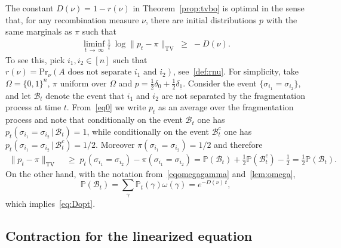 \documentclass[AHL,Unicode,longabstracts,published]{cedram}
\renewcommand{\geq}{\;\geqslant\;}
\newcommand{\si}{\sigma}
\newcommand{\tc}{\, |\, }
\newcommand{\tv}{\mathrm{TV}}
\newcommand{\cB}{\mathcal{B}}
\newcommand{\bbP}{\mathbb{P}}
\let\d=\delta
\let\g=\gamma
\let\o=\omega
\let\O=\Omega
\begin{document}
\begin{rema}\label{rem:Dopt}
The constant $D(\nu)=1-r(\nu)$ in Theorem~\ref{prop:tvbo} is optimal in the sense that, for any recombination measure $\nu$, there are initial distributions $p$ with the same marginals as $\pi$ such that
\begin{align}\label{eq:Dopt}
\liminf_{t\,\to\,\infty}\frac1t \,\log\|p_t-\pi\|_\tv \geq -D(\nu).
\end{align}
To see this, pick $i_1,i_2\in[n]$ such that $r(\nu)=\text{Pr}_\nu\left(A\text{ does not separate $i_1$ and $i_2$}\right)$, see~\eqref{def:rnu}. For simplicity, take $\O=\{0,1\}^n$, $\pi$ uniform over $\O$ and $p=\frac12\d_{\underline 0}+ \frac12\d_{\underline 1}$. Consider the event $\{\si_{i_1}=\si_{i_2}\}$, and let $\cB_t$ denote the event that $i_1$ and $i_2$ are not separated by the fragmentation process at time $t$. From~\eqref{eq0} we write $p_t$ as an average over the fragmentation process and note that conditionally on the event $\cB_t$ one has $p_t(\si_{i_1}=\si_{i_2}\tc\cB_t)=1$, while conditionally on the event $\cB^c_t$ one has $p_t(\si_{i_1}=\si_{i_2}\tc\cB^c_t)=1/2$. Moreover $\pi(\si_{i_1}=\si_{i_2})=1/2$ and therefore
\begin{align*}
\|p_t-\pi\|_\tv &\geq p_t(\si_{i_1}=\si_{i_2}) - \pi(\si_{i_1}=\si_{i_2}) = \bbP(\cB_t) + \tfrac12\bbP(\cB_t^c) - \tfrac12 = \tfrac12\bbP(\cB_t).
\end{align*}
On the other hand, with the notation from~\eqref{eqomegagamma} and~\eqref{lem:omega},
\[
\bbP(\cB_t) = \sum_\g \bbP_t(\g) \o(\g)= e^{-D(\nu)\,t},
\]
which implies~\eqref{eq:Dopt}.
\end{rema}

\subsection{Contraction for the linearized equation}
\end{document}
